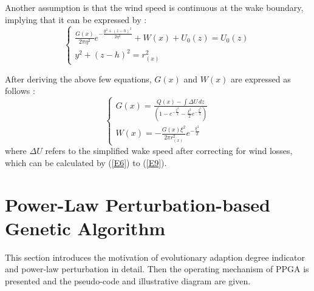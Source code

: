 \documentclass[journal,twoside]{IEEEtran}
\begin{document}
    Another assumption is that the wind speed is continuous at the wake boundary, implying that it can be expressed by \cite{tao2020wind}: 
    \begin{equation}\label{E9}
    	\left\{
    	\begin{array}{c}
    		\frac{G(x)}{2\pi \eta^2} e^{-\frac{y^2 + (z - h)^2}{2 \eta^2}} + W(x) + U_0(z) = U_0(z) \\
    		y^2 + (z - h)^2 = r_{(x)}^2
    	\end{array}
    	\right.
    \end{equation}
    
    After deriving the above few equations, $G(x)$ and $W(x)$ are expressed as follows \cite{sun2023wind}:
    \begin{equation}\label{E10}
    	 \left\{
    	\begin{array}{c}
        G(x) = \frac{Q(x) - \int \Delta U \, dz}{( 1 - e^{-\frac{\xi^2}{2}} - \frac{\xi^2}{2} e^{-\frac{\xi^2}{2}})} \\
    	W(x) = - \frac{G(x) \xi^2}{2 \pi r_{(x)}^2} e^{-\frac{\xi^2}{2}}   	
     	\end{array}
    	\right.
    \end{equation}
     where $\Delta U$ refers to the simplified wake speed after correcting for wind losses, which can be calculated by (\ref{E6}) to (\ref{E9}).
\section{Power-Law Perturbation-based Genetic Algorithm}
\label{sec_PPGA}
This section introduces the motivation of evolutionary adaption degree indicator and power-law perturbation in detail. Then the operating mechanism of PPGA is presented and the pseudo-code and illustrative diagram are given.
\end{document}

